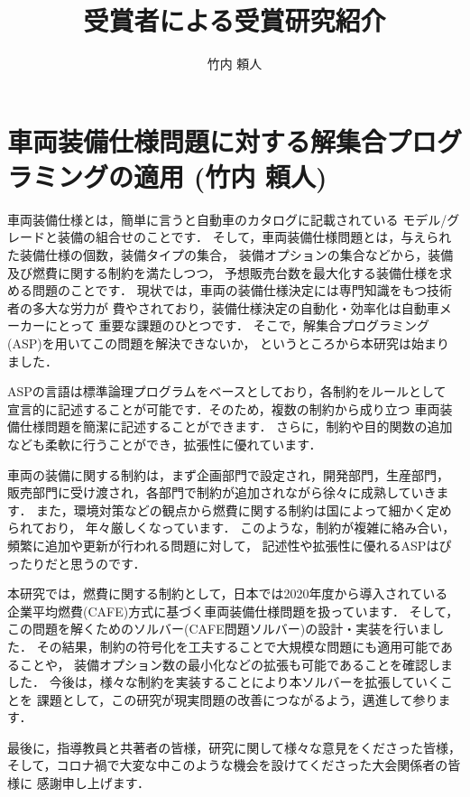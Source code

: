 \documentclass[T]{compsoft}
\begin{document}
\title{受賞者による受賞研究紹介}

%
\author{竹内 頼人}
\maketitle 
\section{車両装備仕様問題に対する解集合プログラミングの適用 (竹内 頼人)}
車両装備仕様とは，簡単に言うと自動車のカタログに記載されている
モデル/グレードと装備の組合せのことです．
そして，車両装備仕様問題とは，与えられた装備仕様の個数，装備タイプの集合，
装備オプションの集合などから，装備及び燃費に関する制約を満たしつつ，
予想販売台数を最大化する装備仕様を求める問題のことです．
現状では，車両の装備仕様決定には専門知識をもつ技術者の多大な労力が
費やされており，装備仕様決定の自動化・効率化は自動車メーカーにとって
重要な課題のひとつです．
そこで，解集合プログラミング(ASP)を用いてこの問題を解決できないか，
というところから本研究は始まりました．

ASPの言語は標準論理プログラムをベースとしており，各制約をルールとして
宣言的に記述することが可能です．そのため，複数の制約から成り立つ
車両装備仕様問題を簡潔に記述することができます．
さらに，制約や目的関数の追加なども柔軟に行うことができ，拡張性に優れています．

車両の装備に関する制約は，まず企画部門で設定され，開発部門，生産部門，
販売部門に受け渡され，各部門で制約が追加されながら徐々に成熟していきます．
また，環境対策などの観点から燃費に関する制約は国によって細かく定められており，
年々厳しくなっています．
このような，制約が複雑に絡み合い，頻繁に追加や更新が行われる問題に対して，
記述性や拡張性に優れるASPはぴったりだと思うのです．

本研究では，燃費に関する制約として，日本では2020年度から導入されている
企業平均燃費(CAFE)方式に基づく車両装備仕様問題を扱っています．
そして，この問題を解くためのソルバー(CAFE問題ソルバー)の設計・実装を行いました．
その結果，制約の符号化を工夫することで大規模な問題にも適用可能であることや，
装備オプション数の最小化などの拡張も可能であることを確認しました．
今後は，様々な制約を実装することにより本ソルバーを拡張していくことを
課題として，この研究が現実問題の改善につながるよう，邁進して参ります．


最後に，指導教員と共著者の皆様，研究に関して様々な意見をくださった皆様，
そして，コロナ禍で大変な中このような機会を設けてくださった大会関係者の皆様に
感謝申し上げます．
\end{document}
